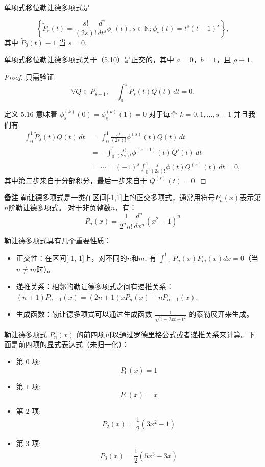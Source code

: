\documentclass[a4paper]{ctexart}
\newcommand{\hl}[1]
{\noindent {\bf {#1}}}
\begin{document}
{\hl{定义 5.16} 单项式移位勒让德多项式是

\[
  \left\{ \widetilde{P}_s(t) = \frac{s!}{(2s)!} \frac{d^s}{dt^s} \phi_s(t) : s \in \mathbb{N}; \phi_s(t) = t^s (t-1)^s \right\},
\]
其中 \( \widetilde{P}_0(t) \equiv 1 \) 当 \( s = 0 \).

\hl{引理 5.17} 单项式移位勒让德多项式关于（5.10）是正交的，其中 \( a = 0 \)，\( b = 1 \)，且 \( \rho \equiv 1 \).

\begin{proof}
只需验证
\[
  \forall Q \in P_{s-1}, \quad \int_0^1 \widetilde{P}_s(t) Q(t) \, dt = 0. \tag{5.12}
\]  

定义 5.16 意味着 \( \phi_s^{(k)}(0) = \phi_s^{(k)}(1) = 0 \) 对于每个 \( k = 0, 1, \ldots, s-1 \) 并且我们有
\begin{align*}
\int_0^1 \widetilde{P}_s(t) Q(t) \, dt &= \int_0^1 \frac{s!}{(2s)!} \phi^{(s)}(t) Q(t) \, dt \\
&= -\int_0^1 \frac{s!}{(2s)!} \phi^{(s-1)}(t) Q'(t) \, dt \\
&= \cdots = (-1)^s \int_0^1 \frac{s!}{(2s)!} \phi(t) Q^{(s)}(t) \, dt = 0,
\end{align*}
其中第二步来自于分部积分，最后一步来自于 \( Q^{(s)}(t) = 0 \).
\end{proof}

\noindent \textbf{备注 }
勒让德多项式是一类在区间[-1,1]上的正交多项式，通常用符号\( P_n(x) \)表示第\( n \)阶勒让德多项式。
对于非负整数\( n \)，有：
\[ 
  P_n(x) = \frac{1}{2^n n!} \frac{d^n}{dx^n} (x^2 - 1)^n 
\]

勒让德多项式具有几个重要性质：
\begin{itemize}
  \item 正交性：在区间[-1, 1]上，对不同的\( n \)和\( m \), 有 \(\int_{-1}^{1} P_n(x) P_m(x) dx = 0\)（当\( n \neq m \)时）。
  \item 递推关系：相邻的勒让德多项式之间有递推关系：\( (n + 1) P_{n + 1}(x) = (2 n + 1) x P_n(x) - n P_{n - 1}(x) \).
  \item 生成函数：勒让德多项式可以通过生成函数 \(\frac{1}{\sqrt{1 - 2 x t + t^2}}\) 的泰勒展开来生成。
\end{itemize}

勒让德多项式 \( P_n(x) \) 的前四项可以通过罗德里格公式或者递推关系来计算。下面是前四项的显式表达式（未归一化）：
\begin{itemize}
  \item 第 $0$ 项:
  \[ P_0(x) = 1 \]
  \item 第 $1$ 项:
  \[ P_1(x) = x \]
  \item 第 $2$ 项:
  \[ P_2(x) = \frac{1}{2}(3x^2 - 1) \]
  \item 第 $3$ 项:
  \[ P_3(x) = \frac{1}{2}(5x^3 - 3x) \]
\end{itemize}

}
\end{document}
